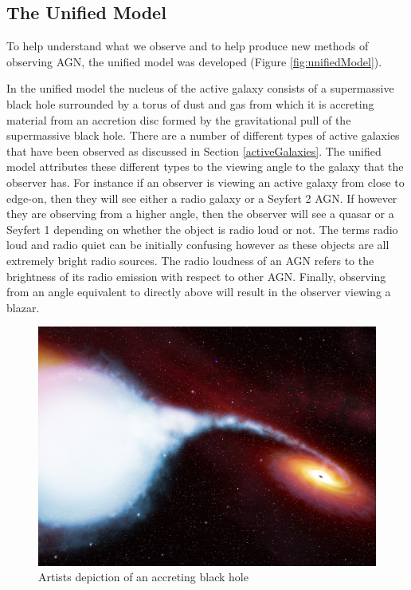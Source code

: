 \documentclass[12pt, oneside]{smuthesis}
\begin{document}
\subsection{\sc The Unified Model} \label{unifiedModel}

To help understand what we observe and to help produce new methods of observing AGN, the unified model was developed (Figure \ref{fig:unifiedModel}).

In the unified model the nucleus of the active galaxy consists of a supermassive black hole surrounded by a torus of dust and gas from which it is accreting material from an accretion disc formed by the gravitational pull of the supermassive black hole. There are a number of different types of active galaxies that have been observed as discussed in Section \ref{activeGalaxies}. The unified model attributes these different types to the viewing angle to the galaxy that the observer has. For instance if an observer is viewing an active galaxy from close to edge-on, then they will see either a radio galaxy or a Seyfert 2 AGN. If however they are observing from a higher angle, then the observer will see a quasar or a Seyfert 1 depending on whether the object is radio loud or not. The terms radio loud and radio quiet can be initially confusing however as these objects are all extremely bright radio sources. The radio loudness of an AGN refers to the brightness of its radio emission with respect to other AGN. Finally, observing from an angle equivalent to directly above will result in the observer viewing a blazar.

\begin{figure}[H]
	\centering
	\begin{minipage}{0.6\linewidth}
		\centering
		\includegraphics[width=0.8\linewidth]{CygX1}
		\caption{Artists depiction of an accreting black hole \citep{cygx1}}
		\label{fig:CygX1}
	\end{minipage}
\end{figure}
\end{document}
